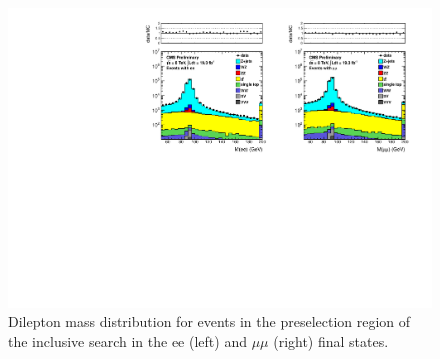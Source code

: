 \begin{figure}[hbt]
  \begin{center}
	\includegraphics[width=1.0\linewidth]{plots/dilmass_2jets_19fb.pdf}
	\caption{
	  \label{fig:dilmass_2j}\protect 
	  Dilepton mass distribution for events in the preselection region of the inclusive search
	  in the ee (left) and $\mu\mu$ (right) final states.}




  \end{center}
\end{figure}

